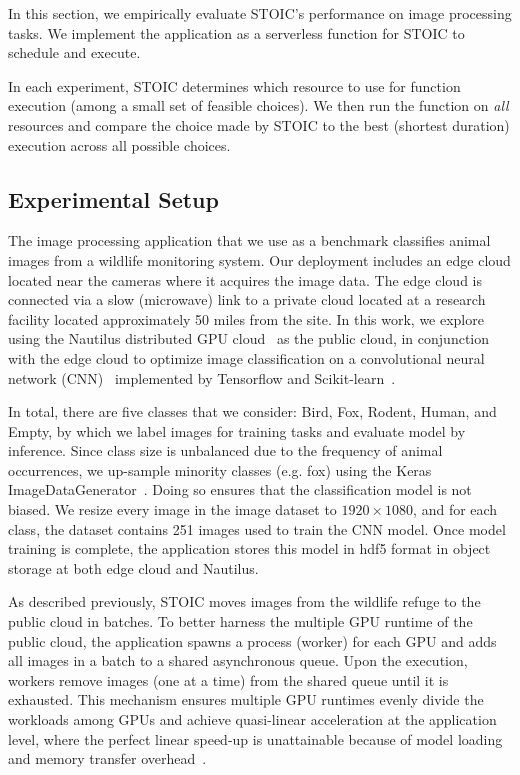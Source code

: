 In this section, we empirically evaluate STOIC's performance on image processing tasks. We implement the application as a serverless function for STOIC to schedule and execute.

In each experiment, STOIC determines which resource to use for function execution (among a small set of feasible choices). We then run the function on \textit{all} resources and compare the choice made by STOIC to the best (shortest duration) execution across all possible choices.

\subsection{Experimental Setup}

The image processing application that we use as a benchmark classifies animal images from a wildlife monitoring system.
Our deployment includes an edge cloud located near the cameras where it acquires the image data. The edge cloud is connected via a slow (microwave) link to a private cloud located at a research facility located approximately 50 miles from the site. In this work, we explore using the Nautilus distributed GPU cloud~\cite{ref:nautilus} as the public cloud, in conjunction with the edge cloud to optimize image classification on a convolutional neural network (CNN)~\cite{ref:cnn} implemented by Tensorflow and Scikit-learn~\cite{ref:scikit}. 

In total, there are five classes that we consider: Bird, Fox, Rodent, Human, and Empty, by which we label images for training tasks and evaluate model by inference. Since class size is unbalanced due to the frequency of animal occurrences, we up-sample minority classes (e.g. fox) using the Keras ImageDataGenerator~\cite{ref:keras}. Doing so ensures that the classification model is not biased. We resize every image in the image dataset to $1920 \times 1080$, and for each class, the dataset contains 251 images used to train the CNN model. Once model training is complete, the application stores this model in hdf5 format in object storage at both edge cloud and Nautilus.

As described previously, STOIC moves images from the wildlife refuge to the public cloud in batches. To better harness the multiple GPU runtime of the public cloud, the application spawns a process (wor\-ker) for each GPU and adds all images in a batch to a shared asynchronous queue. Upon the execution, workers remove images (one at a time) from the shared queue until it is exhausted. This mechanism ensures multiple GPU runtimes evenly divide the workloads among GPUs and achieve quasi-linear acceleration at the application level, where the perfect linear speed-up is unattainable because of model loading and memory transfer overhead~\cite{ref:multi_gpu}. 


